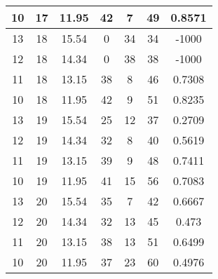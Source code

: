\documentclass[letterpaper, 12pt]{article}
\begin{document}
\begin{longtable}{|c|c|c|c|c|c|c|}
10 & 17 & 11.95 & 42 & 7 & 49 & 0.8571 \\
\hline
13 & 18 & 15.54 & 0 & 34 & 34 & -1000 \\
\hline
12 & 18 & 14.34 & 0 & 38 & 38 & -1000 \\
\hline
11 & 18 & 13.15 & 38 & 8 & 46 & 0.7308 \\
\hline
10 & 18 & 11.95 & 42 & 9 & 51 & 0.8235 \\
\hline
13 & 19 & 15.54 & 25 & 12 & 37 & 0.2709 \\
\hline
12 & 19 & 14.34 & 32 & 8 & 40 & 0.5619 \\
\hline
11 & 19 & 13.15 & 39 & 9 & 48 & 0.7411 \\
\hline
10 & 19 & 11.95 & 41 & 15 & 56 & 0.7083 \\
\hline
13 & 20 & 15.54 & 35 & 7 & 42 & 0.6667 \\
\hline
12 & 20 & 14.34 & 32 & 13 & 45 & 0.473 \\
\hline
11 & 20 & 13.15 & 38 & 13 & 51 & 0.6499 \\
\hline
10 & 20 & 11.95 & 37 & 23 & 60 & 0.4976 \\
\hline
\end{longtable}
\end{document}
